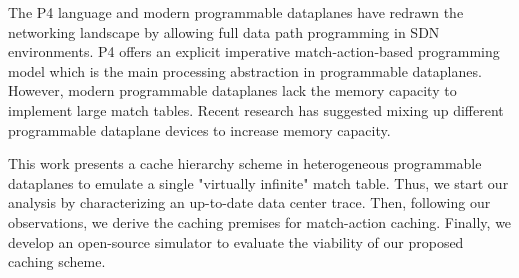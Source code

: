 The P4 language and modern programmable dataplanes have redrawn the networking landscape by allowing full data path programming in SDN environments.
P4 offers an explicit imperative match-action-based programming model which is the main processing abstraction in programmable dataplanes.
However, modern programmable dataplanes lack the memory capacity to implement large match tables.
Recent research has suggested mixing up different programmable dataplane devices to increase memory capacity.

This work presents a cache hierarchy scheme in heterogeneous programmable dataplanes to emulate a single "virtually infinite" match table.
Thus, we start our analysis by characterizing an up-to-date data center trace.
Then, following our observations, we derive the caching premises for match-action caching.
Finally, we develop an open-source simulator to evaluate the viability of our proposed caching scheme.